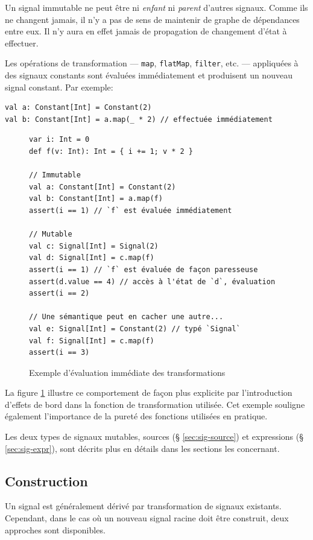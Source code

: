Un signal immutable ne peut être ni \emph{enfant} ni \emph{parent} d'autres signaux. Comme ils ne changent jamais, il n'y a pas de sens de maintenir de graphe de dépendances entre eux. Il n'y aura en effet jamais de propagation de changement d'état à effectuer.

Les opérations de transformation --- \texttt{map}, \texttt{flatMap}, \texttt{filter}, etc. --- appliquées à des signaux constants sont évaluées immédiatement et produisent un nouveau signal constant. Par exemple:

\begin{lstlisting}
val a: Constant[Int] = Constant(2)
val b: Constant[Int] = a.map(_ * 2) // effectuée immédiatement
\end{lstlisting}

\begin{figure}
	\begin{lstlisting}
var i: Int = 0
def f(v: Int): Int = { i += 1; v * 2 }

// Immutable
val a: Constant[Int] = Constant(2)
val b: Constant[Int] = a.map(f)
assert(i == 1) // `f` est évaluée immédiatement

// Mutable
val c: Signal[Int] = Signal(2)
val d: Signal[Int] = c.map(f)
assert(i == 1) // `f` est évaluée de façon paresseuse
assert(d.value == 4) // accès à l'état de `d`, évaluation
assert(i == 2)

// Une sémantique peut en cacher une autre...
val e: Signal[Int] = Constant(2) // typé `Signal`
val f: Signal[Int] = c.map(f)
assert(i == 3)
	\end{lstlisting}
	\caption{Exemple d'évaluation immédiate des transformations}
	\label{fig:constant-eager-transform}
\end{figure}

La figure \ref{fig:constant-eager-transform} illustre ce comportement de façon plus explicite par l'introduction d'effets de bord dans la fonction de transformation utilisée. Cet exemple souligne également l'importance de la pureté des fonctions utilisées en pratique.

Les deux types de signaux mutables, sources (§ \ref{sec:sig-source}) et expressions (§ \ref{sec:sig-expr}), sont décrits plus en détails dans les sections les concernant.

\subsection{Construction}
Un signal est généralement dérivé par transformation de signaux existants. Cependant, dans le cas où un nouveau signal racine doit être construit, deux approches sont disponibles.

